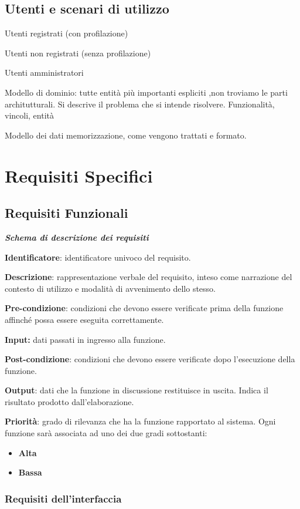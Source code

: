 \documentclass[12pt]{article}
\begin{document}
\subsection{Utenti e scenari di utilizzo}

Utenti registrati (con profilazione)

Utenti non registrati (senza profilazione)

Utenti amministratori

Modello di dominio: tutte entità più importanti espliciti ,non troviamo le parti architutturali. Si descrive il problema che si intende risolvere. Funzionalità, vincoli, entità

Modello dei dati memorizzazione, come vengono trattati e formato.

\newpage
\section{Requisiti Specifici}
\subsection{Requisiti Funzionali}
\textbf{\textit{Schema di descrizione dei requisiti}}

\textbf{Identificatore}: identificatore univoco del requisito.

\textbf{Descrizione}: rappresentazione verbale del requisito, inteso come narrazione del contesto di utilizzo e modalità di avvenimento dello stesso.

\textbf{Pre-condizione}: condizioni che devono essere verificate prima della funzione affinché possa essere eseguita correttamente.

\textbf{Input:} dati passati in ingresso alla funzione.

\textbf{Post-condizione}: condizioni che devono essere verificate dopo l’esecuzione della funzione.

\textbf{Output}: dati che la funzione in discussione restituisce in uscita. Indica il risultato prodotto dall’elaborazione.

\textbf{Priorità}: grado di rilevanza che ha la funzione rapportato al sistema. Ogni funzione sarà associata ad uno dei due gradi sottostanti:
\begin{itemize}
\item \textbf{Alta}
\item \textbf{Bassa}
\end{itemize}

\subsubsection{Requisiti dell'interfaccia}
\end{document}
